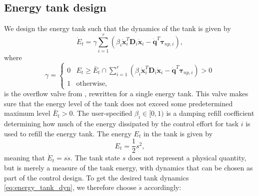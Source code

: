 \documentclass[../main.tex]{subfiles}
\begin{document}
\subsection{Energy tank design}
We design the energy tank such that the dynamics of the tank is given by
\begin{equation} \label{eq:energy_tank_dyn}
    \dot{E}_{t} = \gamma\sum_{i=1}^r \left(\beta_{i} \dot{\bm{x}}_{i}^T\bm{D}_{i}\dot{\bm{x}}_{i} - \dot{\bm{q}}^T\bm{\tau}_{np,i} \right),
\end{equation}
where
\begin{equation} \label{eq:gamma}
    \gamma = \begin{cases}
        0  & E_{t}\geq \bar{E}_{t} \cap \sum_{i=1}^r(\beta_{i}\dot{\bm{x}}_{i}^T\bm{D}_{i}\dot{\bm{x}}_{i} - \dot{\bm{q}}^T\bm{\tau}_{np,i})>0 \\
        1 & \text{otherwise},
        \end{cases}
\end{equation}
is the overflow valve from \cite{dietrichPassiveHierarchicalImpedance2017}, rewritten for a single energy tank.
This valve makes sure that the energy level of the tank does not exceed some predetermined maximum level $\bar{E}_{t}>0$.
The user-specified $\beta_i\in [0,1)$ is a damping refill coefficient determining how much of the energy dissipated by the control effort for task $i$ is used to refill the energy tank. The energy $E_t$ in the tank is given by \cite{stramigioliEnergyAwareRobotics2015}
\begin{equation}
    E_t = \frac{1}{2} s^{2},
\end{equation}
meaning that $\dot{E}_t = s\dot{s}$. The tank state $s$ does not represent a physical quantity, but is merely a measure of the tank energy, with dynamics that can be chosen as part of the control design. To get the desired tank dynamics \eqref{eq:energy_tank_dyn}, we therefore choose $\dot{s}$ accordingly:
\end{document}
